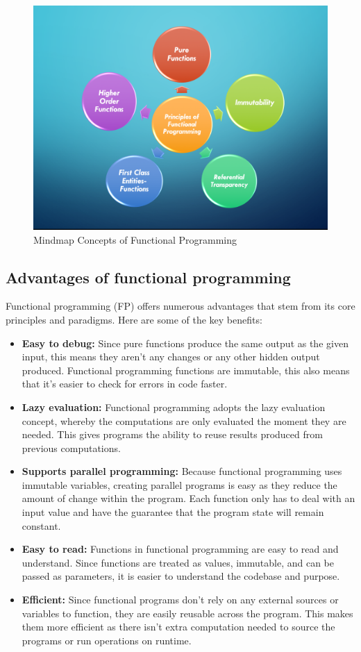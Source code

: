\documentclass[12pt]{article}
\begin{document}
\begin{figure}[h!]
\begin{center}
\includegraphics[width=13cm]{Intro1.png}\\
Mindmap Concepts of Functional Programming
\end{center}
\end{figure}

\subsection{Advantages of functional programming}
Functional programming (FP) offers numerous advantages that stem from its core principles and paradigms. Here are some of the key benefits:
\begin{itemize}
    \item \textbf{Easy to debug:} Since pure functions produce the same output as the given input, this means they aren’t any changes or any other hidden output produced. Functional programming functions are immutable, this also means that it’s easier to check for errors in code faster.
    \item \textbf{Lazy evaluation:} Functional programming adopts the lazy evaluation concept, whereby the computations are only evaluated the moment they are needed. This gives programs the ability to reuse results produced from previous computations.
    \item \textbf{Supports parallel programming:} Because functional programming uses immutable variables, creating parallel programs is easy as they reduce the amount of change within the program. Each function only has to deal with an input value and have the guarantee that the program state will remain constant.
    \item \textbf{Easy to read:} Functions in functional programming are easy to read and understand. Since functions are treated as values, immutable, and can be passed as parameters, it is easier to understand the codebase and purpose.
    \item \textbf{Efficient:} Since functional programs don’t rely on any external sources or variables to function, they are easily reusable across the program. This makes them more efficient as there isn’t extra computation needed to source the programs or run operations on runtime.
\end{itemize}
\end{document}
